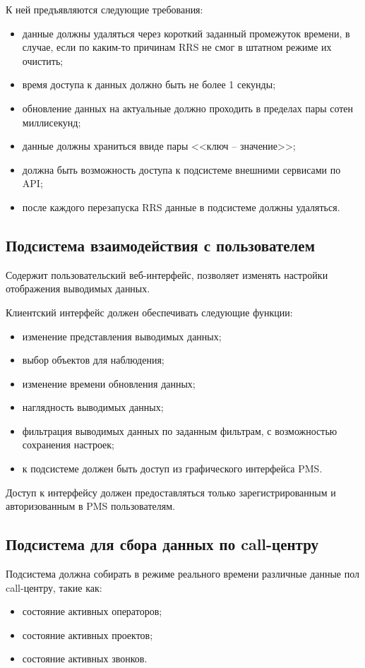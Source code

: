 К ней предъявляются следующие требования:
\begin{itemize}
    \item данные должны удаляться через короткий заданный промежуток времени, в случае,
    если по каким-то причинам RRS не смог в штатном режиме их очистить;
    \item время доступа к данных должно быть не более 1 секунды;
    \item обновление данных на актуальные должно проходить в пределах пары сотен миллисекунд;
    \item данные должны храниться ввиде пары <<ключ -- значение>>;
    \item должна быть возможность доступа к подсистеме внешними сервисами по API;
    \item после каждого перезапуска RRS данные в подсистеме должны удаляться.
\end{itemize}

\subsection{Подсистема взаимодействия с пользователем}

Содержит пользовательский веб-интерфейс, позволяет изменять настройки отображения выводимых данных.

Клиентский интерфейс должен обеспечивать следующие функции:
\begin{itemize}
    \item изменение представления выводимых данных;
    \item выбор объектов для наблюдения;
    \item изменение времени обновления данных;
    \item наглядность выводимых данных;
    \item фильтрация выводимых данных по заданным фильтрам, с возможностью сохранения настроек;
    \item к подсистеме должен быть доступ из графического интерфейса PMS\@.
\end{itemize}

Доступ к интерфейсу должен предоставляться только зарегистрированным и авторизованным в PMS пользователям.

\subsection{Подсистема для сбора данных по call-центру}

Подсистема должна собирать в режиме реального времени различные данные пол call-центру, такие как:
\begin{itemize}
    \item состояние активных операторов;
    \item состояние активных проектов;
    \item состояние активных звонков.
\end{itemize}


